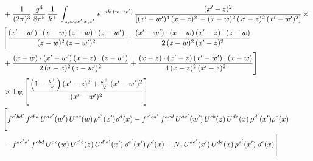 \documentclass[9pt]{article}
\numberwithin{equation}{section}
\begin{document}
\begin{align}
&  + \frac{1}{(2\pi)^{3}}\, \frac{g^{4}}{8\pi^{5}}\,\frac{1}{k^{+}}\,\int_{z,w,w^{\prime},x,x'}\, e^{-ik\cdot (w-w')}\, \frac{(x'-z)^{2}}{\left[(x'-w')^{4}\,(x-z)^{2}\, - (x-w)^{2}\, (x'-z)^{2}\,(x'-w')^{2}\right]}\,  \times\notag \\ & \Bigg[\frac{(x'-w')\cdot (x-w)\, (z-w)\cdot (z-w')}{(z-w)^{2}\, (z-w')^{2}}+\frac{(x'-w')\cdot (x-w)\, (x'-z)\cdot (z-w)}{2\, (z-w)^{2}\, (x'-z)^{2}}\notag \\ & +\frac{(x-w)\cdot (x'-w')\, (x-z)\cdot (z-w')}{2\, (x-z)^{2}\, (z-w')^{2}}+\frac{(x-z)\cdot (x'-z)\, (x'-w')\cdot (x-w)}{4\, (x-z)^{2}\, (x'-z)^{2}}\Bigg] \notag \\ & \times\,\log{\left[\frac{\left(1-\frac{k^{+}}{\vee}\right)(x'-z)^{2}+\frac{k^{+}}{\vee}\,(x'-w')^{2}}{(x'-w')^{2}}\right]} \notag \\ & \Bigg[f^{c'bd'}\,f^{cbd}\, U^{ac'}(w')\,U^{ac}(w)\,\rho^{d'}(x')\rho^{d}(x)- f^{c'bd'}\,f^{acd}\,U^{ac'}(w')\,U^{cb}(z)\,U^{de}(x)\,\rho^{d'}(x')\rho^{e}(x) \notag \\ & -f^{ac'd'}\,f^{cbd}\,U^{ac}(w)\,U^{c'b}(z)\,U^{d'e'}(x')\,\rho^{e'}(x')\,\rho^{d}(x) +N_{c}\,U^{de'}(x')\,U^{de}(x)\,\rho^{e'}(x')\,\rho^{e}(x)\Bigg]
\end{align}
\end{document}
